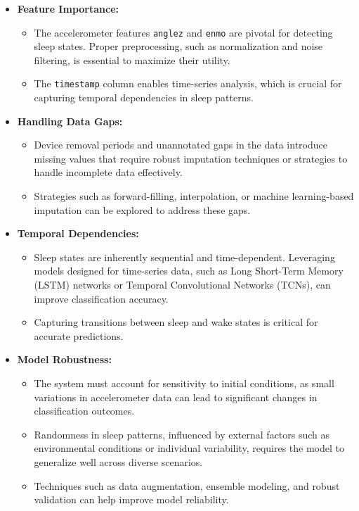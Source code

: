 \documentclass[conference]{IEEEtran}
\begin{document}
\begin{itemize}
    \item \textbf{Feature Importance:}
    \begin{itemize}
        \item The accelerometer features \texttt{anglez} and \texttt{enmo} are pivotal for detecting sleep states. Proper preprocessing, such as normalization and noise filtering, is essential to maximize their utility.
        \item The \texttt{timestamp} column enables time-series analysis, which is crucial for capturing temporal dependencies in sleep patterns.
    \end{itemize}
    
    \item \textbf{Handling Data Gaps:}
    \begin{itemize}
        \item Device removal periods and unannotated gaps in the data introduce missing values that require robust imputation techniques or strategies to handle incomplete data effectively.
        \item Strategies such as forward-filling, interpolation, or machine learning-based imputation can be explored to address these gaps.
    \end{itemize}
    
    \item \textbf{Temporal Dependencies:}
    \begin{itemize}
        \item Sleep states are inherently sequential and time-dependent. Leveraging models designed for time-series data, such as Long Short-Term Memory (LSTM) networks or Temporal Convolutional Networks (TCNs), can improve classification accuracy.
        \item Capturing transitions between sleep and wake states is critical for accurate predictions.
    \end{itemize}
    
    \item \textbf{Model Robustness:}
    \begin{itemize}
        \item The system must account for sensitivity to initial conditions, as small variations in accelerometer data can lead to significant changes in classification outcomes.
        \item Randomness in sleep patterns, influenced by external factors such as environmental conditions or individual variability, requires the model to generalize well across diverse scenarios.
        \item Techniques such as data augmentation, ensemble modeling, and robust validation can help improve model reliability.
    \end{itemize}
    

\end{itemize}
\end{document}

